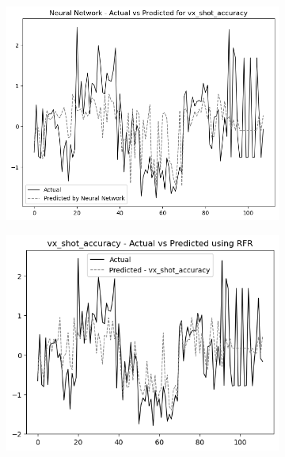 \begin{figure}
    \centering
    \begin{subfigure}[b]{0.49\textwidth}
        \centering
        \includegraphics[width=\linewidth]{images/nnCharts/all_data_visual_shot_accuracy.png}
    \end{subfigure}\hfill
    \begin{subfigure}[b]{0.49\textwidth}
        \centering
        \includegraphics[width=\linewidth]{images/regressionCharts/all_data_visual_shot_accuracy.png}
    \end{subfigure}
    

\end{figure}
